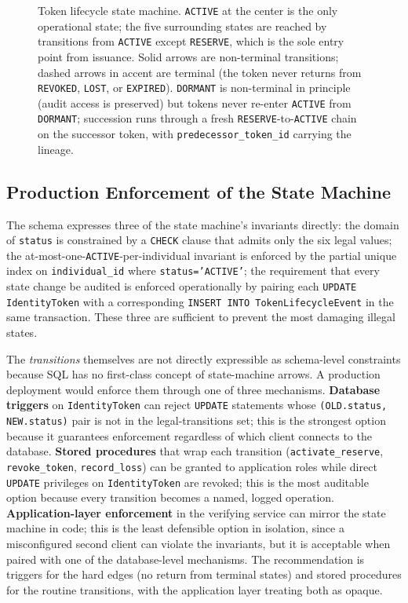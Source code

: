 \documentclass[11pt,letterpaper]{article}
\newcommand{\entity}[1]{\texttt{\color{navydark}#1}}
\begin{document}
\begin{figure}[H]
\begin{tikzpicture}
\end{tikzpicture}

\caption{Token lifecycle state machine. \texttt{ACTIVE} at the center is the only operational state; the five surrounding states are reached by transitions from \texttt{ACTIVE} except \texttt{RESERVE}, which is the sole entry point from issuance. Solid arrows are non-terminal transitions; dashed arrows in accent are terminal (the token never returns from \texttt{REVOKED}, \texttt{LOST}, or \texttt{EXPIRED}). \texttt{DORMANT} is non-terminal in principle (audit access is preserved) but tokens never re-enter \texttt{ACTIVE} from \texttt{DORMANT}; succession runs through a fresh \texttt{RESERVE}-to-\texttt{ACTIVE} chain on the successor token, with \texttt{predecessor\_token\_id} carrying the lineage.}
\label{fig:state-machine}
\end{figure}

\subsection*{Production Enforcement of the State Machine}

The schema expresses three of the state machine's invariants directly: the domain of \texttt{status} is constrained by a \texttt{CHECK} clause that admits only the six legal values; the at-most-one-\texttt{ACTIVE}-per-individual invariant is enforced by the partial unique index on \texttt{individual\_id} where \texttt{status='ACTIVE'}; the requirement that every state change be audited is enforced operationally by pairing each \texttt{UPDATE IdentityToken} with a corresponding \texttt{INSERT INTO TokenLifecycleEvent} in the same transaction. These three are sufficient to prevent the most damaging illegal states.

The \textit{transitions} themselves are not directly expressible as schema-level constraints because SQL has no first-class concept of state-machine arrows. A production deployment would enforce them through one of three mechanisms. \textbf{Database triggers} on \entity{IdentityToken} can reject \texttt{UPDATE} statements whose \texttt{(OLD.status, NEW.status)} pair is not in the legal-transitions set; this is the strongest option because it guarantees enforcement regardless of which client connects to the database. \textbf{Stored procedures} that wrap each transition (\texttt{activate\_reserve}, \texttt{revoke\_token}, \texttt{record\_loss}) can be granted to application roles while direct \texttt{UPDATE} privileges on \entity{IdentityToken} are revoked; this is the most auditable option because every transition becomes a named, logged operation. \textbf{Application-layer enforcement} in the verifying service can mirror the state machine in code; this is the least defensible option in isolation, since a misconfigured second client can violate the invariants, but it is acceptable when paired with one of the database-level mechanisms. The recommendation is triggers for the hard edges (no return from terminal states) and stored procedures for the routine transitions, with the application layer treating both as opaque.
\end{document}
